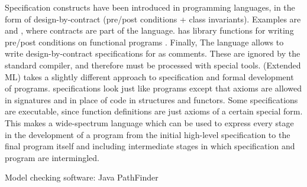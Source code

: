 Specification constructs have been introduced in programming
languages, in the form of design-by-contract (pre/post conditions +
class invariants). Examples are \eiffel{} \cite{eiffel} and
\specsharp{} \cite{specsharp}, where contracts are part of the
language. \scala{} has library functions for writing pre/post
conditions on functional programs \cite{odersky-rv10}. Finally, The
\jml{} language \cite{jml} allows to write design-by-contract
specifications for \java{} as comments. These are ignored by the
standard \java{} compiler, and therefore must be processed with
special tools. \eml{} (Extended ML) \cite{sannella-eml-97} takes a
slightly different approach to specification and formal development of
\sml{} programs.  \eml{} specifications look just like \sml{} programs
except that axioms are allowed in signatures and in place of code in
structures and functors. Some \eml{} specifications are executable,
since \sml{} function definitions are just axioms of a certain special
form. This makes \eml{} a wide-spectrum language which can be used to
express every stage in the development of a \sml{} program from the
initial high-level specification to the final program itself and
including intermediate stages in which specification and program are
intermingled.

Model checking software:
  Java PathFinder 
    \cite{havelund-jpf-00}
    \cite{havelund-visser02}  
  \cite{holzmann-spin-2004}


